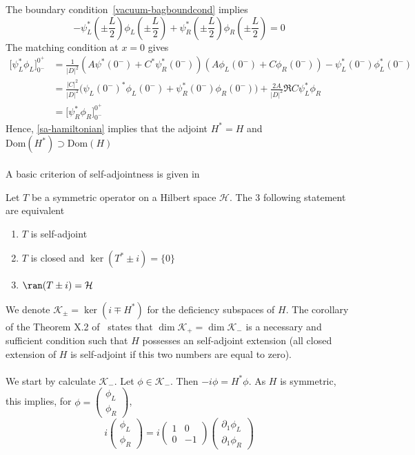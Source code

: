 The boundary condition~\cref{vacuum-bagboundcond} implies
\begin{equation*}
- \psi_L^*(\pm \frac{L}{2}) \phi_L(\pm \frac{L}{2}) + \psi_R^*(\pm \frac{L}{2}) \phi_R(\pm \frac{L}{2}) =0
\end{equation*}
The matching condition at $x = 0$ gives
\begin{equation*}
\begin{split}
\big[ \psi^*_L\phi_L] ^{0^+}_{0^-} & = \frac{1}{|D|^2}(A \psi^*(0^-) + C^*\psi^*_R(0^-))(A \phi_L(0^-) + C\phi_R(0^-)) - \psi^*_L(0^-)\phi^*_L(0^-) \\
& = \frac{|C|^2}{|D|^2}\big(\psi_L(0^-)^*\phi_L(0^-) + \psi_R^*(0^-) \phi_R(0^-)\big) +
\frac{2A}{|D|^2}\Re{C\psi_L^* \phi_R} \\
& = \big[ \psi^*_R\phi_R] ^{0^+}_{0^-}
\end{split}
\end{equation*}
Hence, \cref{sa-hamiltonian} implies that the adjoint $H^* = H$ and $\mathrm{Dom}(H^*) \supset \mathrm{Dom}(H)$ 
\\\\
A basic criterion of self-adjointness is given in~\cite{Reed1981}
\begin{theorem}
Let $T$ be a symmetric operator on a Hilbert space $ \mathcal{H}$. The 3 following statement are equivalent 
\begin{enumerate}
\item $T$ is self-adjoint
\item $T$ is closed and $\ker(T^* \pm i) = \{0\}$
\item $\ran(T \pm i ) = \mathcal{H}$
\end{enumerate} 
\end{theorem}
We denote  $\mathcal{K}_{\pm} = \ker (i \mp H^*)$ for the deficiency subspaces of $H$. The corollary of the Theorem X.2 of~\cite{Reed1975} states that $\dim \mathcal{K}_+ = \dim \mathcal{K}_-$ is a necessary and sufficient condition such that $H$ possesses an self-adjoint extension (all closed extension of $H$ is self-adjoint if this two numbers are equal to zero). \\\\
We start by calculate $\mathcal{K}_-$. Let $\phi \in \mathcal{K}_-$. Then $- i \phi = H^* \phi$. As $H$ is symmetric, this implies, for $\phi = \begin{pmatrix} \phi_L \\  \phi_R \end{pmatrix}$, 
\begin{equation}
i \begin{pmatrix} \phi_L \\ \phi_R \end{pmatrix} = 
i \begin{pmatrix} 1 & 0  \\ 0  &  -1 \end{pmatrix} 
\begin{pmatrix} \partial_1 \phi_L  \\  \partial_1\phi_R \end{pmatrix}
\end{equation} 
